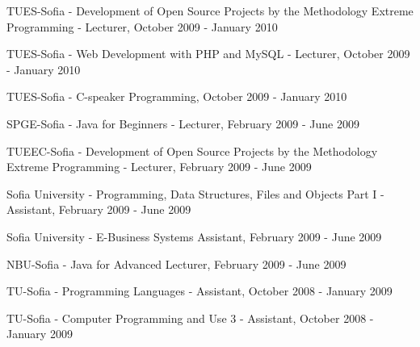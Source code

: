 \documentclass[english,a4paper]{europasscv}
\begin{document}
\begin{europasscv}
{\begin{ecvitemize}
    \item TUES-Sofia - Development of Open Source Projects by the Methodology Extreme Programming - Lecturer, October 2009 - January 2010
    \item TUES-Sofia - Web Development with PHP and MySQL - Lecturer, October 2009 - January 2010
    \item TUES-Sofia - C-speaker Programming, October 2009 - January 2010
    \item SPGE-Sofia - Java for Beginners - Lecturer, February 2009 - June 2009
    \item TUEEC-Sofia - Development of Open Source Projects by the Methodology Extreme Programming - Lecturer, February 2009 - June 2009
    \item Sofia University - Programming, Data Structures, Files and Objects Part I - Assistant, February 2009 - June 2009
    \item Sofia University - E-Business Systems Assistant, February 2009 - June 2009
    \item NBU-Sofia - Java for Advanced Lecturer, February 2009 - June 2009
    \item TU-Sofia - Programming Languages - Assistant, October 2008 - January 2009
    \item TU-Sofia - Computer Programming and Use 3 - Assistant, October 2008 - January 2009 
  \end{ecvitemize}}
  

\end{europasscv}
\end{document}
